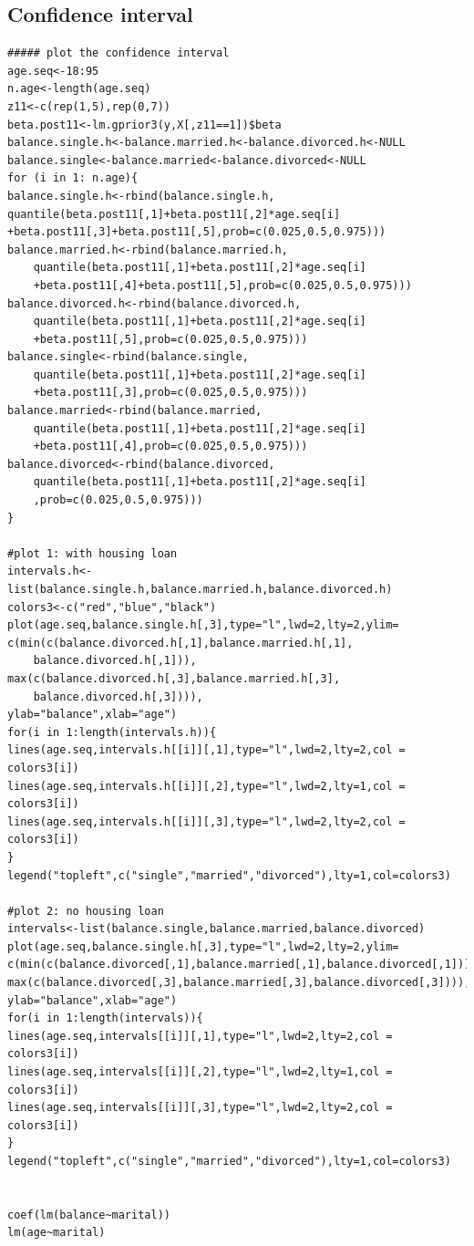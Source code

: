 \documentclass[a4page]{article}
\begin{document}
\subsection{Confidence interval}
\begin{verbatim}
##### plot the confidence interval
age.seq<-18:95
n.age<-length(age.seq)
z11<-c(rep(1,5),rep(0,7))
beta.post11<-lm.gprior3(y,X[,z11==1])$beta
balance.single.h<-balance.married.h<-balance.divorced.h<-NULL
balance.single<-balance.married<-balance.divorced<-NULL
for (i in 1: n.age){
balance.single.h<-rbind(balance.single.h,
quantile(beta.post11[,1]+beta.post11[,2]*age.seq[i]
+beta.post11[,3]+beta.post11[,5],prob=c(0.025,0.5,0.975)))
balance.married.h<-rbind(balance.married.h,
    quantile(beta.post11[,1]+beta.post11[,2]*age.seq[i]
    +beta.post11[,4]+beta.post11[,5],prob=c(0.025,0.5,0.975)))
balance.divorced.h<-rbind(balance.divorced.h,
    quantile(beta.post11[,1]+beta.post11[,2]*age.seq[i]
    +beta.post11[,5],prob=c(0.025,0.5,0.975)))
balance.single<-rbind(balance.single,
    quantile(beta.post11[,1]+beta.post11[,2]*age.seq[i]
    +beta.post11[,3],prob=c(0.025,0.5,0.975)))
balance.married<-rbind(balance.married,
    quantile(beta.post11[,1]+beta.post11[,2]*age.seq[i]
    +beta.post11[,4],prob=c(0.025,0.5,0.975)))
balance.divorced<-rbind(balance.divorced,
    quantile(beta.post11[,1]+beta.post11[,2]*age.seq[i]
    ,prob=c(0.025,0.5,0.975)))
}

#plot 1: with housing loan
intervals.h<-list(balance.single.h,balance.married.h,balance.divorced.h)
colors3<-c("red","blue","black")
plot(age.seq,balance.single.h[,3],type="l",lwd=2,lty=2,ylim=
c(min(c(balance.divorced.h[,1],balance.married.h[,1],
    balance.divorced.h[,1])),
max(c(balance.divorced.h[,3],balance.married.h[,3],
    balance.divorced.h[,3]))),
ylab="balance",xlab="age")
for(i in 1:length(intervals.h)){
lines(age.seq,intervals.h[[i]][,1],type="l",lwd=2,lty=2,col = colors3[i])
lines(age.seq,intervals.h[[i]][,2],type="l",lwd=2,lty=1,col = colors3[i])
lines(age.seq,intervals.h[[i]][,3],type="l",lwd=2,lty=2,col = colors3[i])
}
legend("topleft",c("single","married","divorced"),lty=1,col=colors3)

#plot 2: no housing loan
intervals<-list(balance.single,balance.married,balance.divorced)
plot(age.seq,balance.single.h[,3],type="l",lwd=2,lty=2,ylim=
c(min(c(balance.divorced[,1],balance.married[,1],balance.divorced[,1])),
max(c(balance.divorced[,3],balance.married[,3],balance.divorced[,3]))),
ylab="balance",xlab="age")
for(i in 1:length(intervals)){
lines(age.seq,intervals[[i]][,1],type="l",lwd=2,lty=2,col = colors3[i])
lines(age.seq,intervals[[i]][,2],type="l",lwd=2,lty=1,col = colors3[i])
lines(age.seq,intervals[[i]][,3],type="l",lwd=2,lty=2,col = colors3[i])
}
legend("topleft",c("single","married","divorced"),lty=1,col=colors3)


coef(lm(balance~marital))
lm(age~marital)

    \end{verbatim}
    
\end{document}
